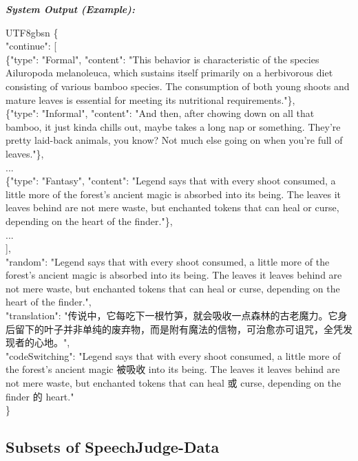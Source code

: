 \documentclass[]{bytedance_seed}
\begin{document}
\begin{promptbox}
\medskip \textit{\textbf{System Output (Example):} }\\
\begin{CJK*}{UTF8}{gbsn}
\{\\
"continue": [\\
\{"type": "Formal", "content": "This behavior is characteristic of the species Ailuropoda melanoleuca, which sustains itself primarily on a herbivorous diet consisting of various bamboo species. The consumption of both young shoots and mature leaves is essential for meeting its nutritional requirements."\},\\
\{"type": "Informal", "content": "And then, after chowing down on all that bamboo, it just kinda chills out, maybe takes a long nap or something. They're pretty laid-back animals, you know? Not much else going on when you're full of leaves."\},\\
...\\
\{"type": "Fantasy", "content": "Legend says that with every shoot consumed, a little more of the forest's ancient magic is absorbed into its being. The leaves it leaves behind are not mere waste, but enchanted tokens that can heal or curse, depending on the heart of the finder."\},\\
...\\
],\\
"random": "Legend says that with every shoot consumed, a little more of the forest's ancient magic is absorbed into its being. The leaves it leaves behind are not mere waste, but enchanted tokens that can heal or curse, depending on the heart of the finder.",\\
"translation": "传说中，它每吃下一根竹笋，就会吸收一点森林的古老魔力。它身后留下的叶子并非单纯的废弃物，而是附有魔法的信物，可治愈亦可诅咒，全凭发现者的心地。",\\
"codeSwitching": "Legend says that with every shoot consumed, a little more of the forest's ancient magic 被吸收 into its being. The leaves it leaves behind are not mere waste, but enchanted tokens that can heal 或 curse, depending on the finder 的 heart."\\
\}
\end{CJK*}

\end{promptbox}

\subsection{Subsets of SpeechJudge-Data}\label{app:subsets-of-speechjudge-data}
\end{document}
